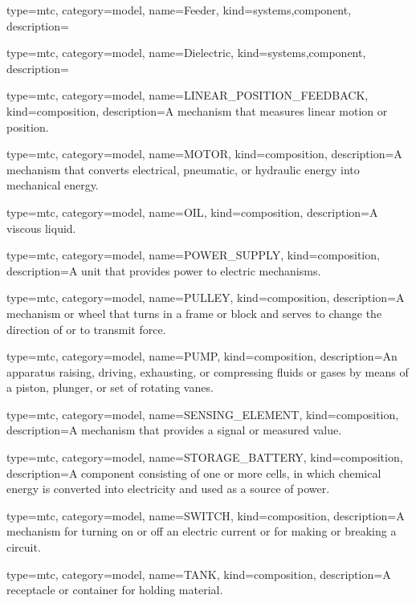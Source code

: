 {
  type=mtc,
  category=model,
  name={Feeder},
  kind={systems,component},
  description={}
}


{
  type=mtc,
  category=model,
  name={Dielectric},
  kind={systems,component},
  description={}
}


{
  type=mtc,
  category=model,
  name={LINEAR\_POSITION\_FEEDBACK},
  kind={composition},
  description={A mechanism that measures linear motion or position.}
}


{
  type=mtc,
  category=model,
  name={MOTOR},
  kind={composition},
  description={A mechanism that converts electrical, pneumatic, or hydraulic energy into mechanical energy.}
}


{
  type=mtc,
  category=model,
  name={OIL},
  kind={composition},
  description={A viscous liquid.}
}


{
  type=mtc,
  category=model,
  name={POWER\_SUPPLY},
  kind={composition},
  description={A unit that provides power to electric mechanisms.}
}


{
  type=mtc,
  category=model,
  name={PULLEY},
  kind={composition},
  description={A mechanism or wheel that turns in a frame or block and serves to change the direction of or to transmit force.}
}


{
  type=mtc,
  category=model,
  name={PUMP},
  kind={composition},
  description={An apparatus raising, driving, exhausting, or compressing fluids or gases by means of a piston, plunger, or set of rotating vanes.}
}


{
  type=mtc,
  category=model,
  name={SENSING\_ELEMENT},
  kind={composition},
  description={A mechanism that provides a signal or measured value.}
}


{
  type=mtc,
  category=model,
  name={STORAGE\_BATTERY},
  kind={composition},
  description={A component consisting of one or more cells, in which chemical energy is converted into electricity and used as a source of power. }
}


{
  type=mtc,
  category=model,
  name={SWITCH},
  kind={composition},
  description={A mechanism for turning on or off an electric current or for making or breaking a circuit.}
}


{
  type=mtc,
  category=model,
  name={TANK},
  kind={composition},
  description={A receptacle or container for holding material.}
}


